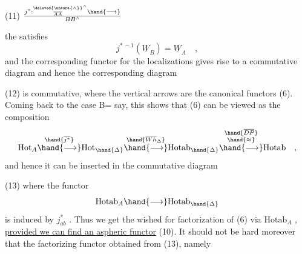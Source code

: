 
(11) \qquad $j^{*} : \overset{\deleted{\unsure{\wedge}}}{\over{A}{A}}^{\wedge}\hand{\longrightarrow} \over{B}{B}^{\wedge}$

the satisfies
\[ j^{*\,-1}(\underline{W}_B) = \underline{W}_A \quad , \]
and the corresponding functor for the localizations gives rise to a
commutative diagram
and hence the corresponding diagram

(12)
is commutative, where the vertical arrows are the canonical functors
(6). Coming back to the case B=\hand{$\Delta$} say, this shows that (6) can be
viewed as the composition
\[ \mathrm{Hot}_A \overset{\hand{\overline{j^*}}}{\hand{\longrightarrow}} \mathrm{Hot}_{\hand{\Delta}} \overset{\hand{\overline{Wh}_{\Delta}}}{\hand{\longrightarrow}} \mathrm{Hotab}_{\hand{\Delta}} \overset{\substack{\hand{\overline{DP}}\\ \hand{\approx}}}{\hand{\longrightarrow}} \mathrm{Hotab} \quad , \]
and hence it can be inserted in the commutative diagram

(13)
where the functor
\[ \mathrm{Hotab}_A \hand{\longrightarrow} \mathrm{Hotab}_{\hand{\Delta}} \]
is induced by $j^{*}_{ab}$ . Thus we get the wished for factorization of (6)
via $\mathrm{Hotab}_A$ , \uline{provided we can find an aspheric functor} (10). It
should not be hard moreover  that the factorizing functor obtained
from (13), namely

